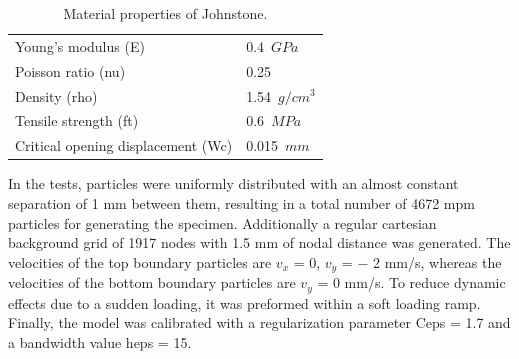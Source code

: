 \documentclass[preprint,12pt,a4paper]{elsarticle}
\begin{document}
\begin{table}
  \centering
  \begin{tabular}[]{l l}
    \hline
    Young's modulus (\gls{E})   & 0.4\ $GPa$       \\
    Poisson ratio (\gls{nu})    & 0.25           \\
    Density (\gls{rho})         & 1.54\ $g/cm^3$ \\
    Tensile strength (\gls{ft}) & 0.6\ $MPa$       \\
    Critical opening displacement (\gls{Wc}) & 0.015\ $mm$ \\
    \hline
  \end{tabular}
  \caption[Mechanical properties of Johnstone. ]{Material properties of Johnstone.}
  \label{tab:Johnstone-properties}
\end{table}
In the tests, particles were uniformly distributed with an almost
constant separation of 1 mm between them, resulting in a total number of 4672
\acrshort{mpm} particles for generating the specimen. Additionally a
regular cartesian background grid of 1917 nodes with 1.5 mm of nodal distance
was generated. The velocities of the top boundary particles are $v_x$ = 0, $v_y$ = −
2 mm/s, whereas the velocities of the bottom boundary particles are
$v_y$ = 0 mm/s. To reduce dynamic effects due to a sudden loading, it
was preformed within a soft loading ramp. Finally, the model was
calibrated with a regularization parameter \gls{Ceps} = 1.7 and a
bandwidth value \gls{heps} = 15.
\end{document}
